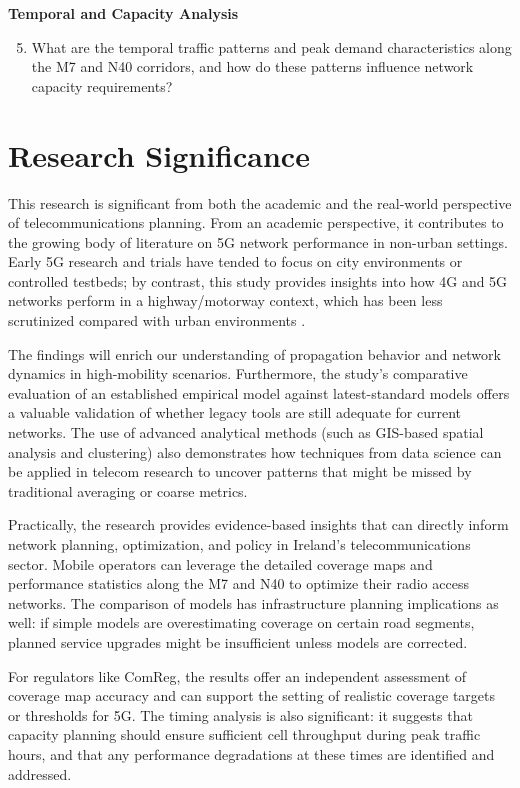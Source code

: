 \documentclass[MScCS]{uccthesis}
\begin{document}
\textbf{Temporal and Capacity Analysis}
\begin{enumerate}
\setcounter{enumi}{4}
\item What are the temporal traffic patterns and peak demand characteristics along the M7 and N40 corridors, and how do these patterns influence network capacity requirements?
\end{enumerate}

\section{Research Significance}

This research is significant from both the academic and the real-world perspective of telecommunications planning. From an academic perspective, it contributes to the growing body of literature on 5G network performance in non-urban settings. Early 5G research and trials have tended to focus on city environments or controlled testbeds; by contrast, this study provides insights into how 4G and 5G networks perform in a highway/motorway context, which has been less scrutinized compared with urban environments \cite{tsoulos2024highway}.

The findings will enrich our understanding of propagation behavior and network dynamics in high-mobility scenarios. Furthermore, the study's comparative evaluation of an established empirical model against latest-standard models offers a valuable validation of whether legacy tools are still adequate for current networks. The use of advanced analytical methods (such as GIS-based spatial analysis and clustering) also demonstrates how techniques from data science can be applied in telecom research to uncover patterns that might be missed by traditional averaging or coarse metrics.

Practically, the research provides evidence-based insights that can directly inform network planning, optimization, and policy in Ireland's telecommunications sector. Mobile operators can leverage the detailed coverage maps and performance statistics along the M7 and N40 to optimize their radio access networks. The comparison of models has infrastructure planning implications as well: if simple models are overestimating coverage on certain road segments, planned service upgrades might be insufficient unless models are corrected.

For regulators like ComReg, the results offer an independent assessment of coverage map accuracy and can support the setting of realistic coverage targets or thresholds for 5G. The timing analysis is also significant: it suggests that capacity planning should ensure sufficient cell throughput during peak traffic hours, and that any performance degradations at these times are identified and addressed.
\end{document}
